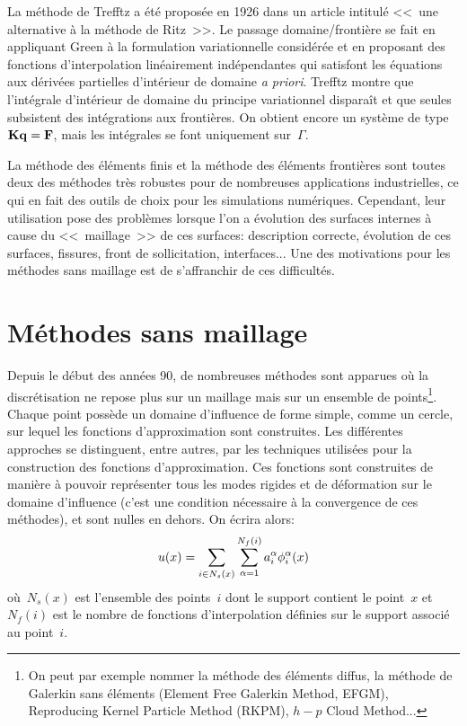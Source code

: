 \medskip
La méthode de Trefftz a été proposée en 1926 dans un article intitulé <<~une alternative à la méthode de Ritz~>>. Le passage domaine/frontière se fait en appliquant Green à la formulation variationnelle considérée et en proposant des fonctions d'interpolation linéairement indépendantes qui satisfont les équations aux dérivées partielles d'intérieur de domaine \emph{a priori}. Trefftz montre que l'intégrale d'intérieur de domaine du principe variationnel disparaît et que seules subsistent des intégrations aux frontières. 
On obtient encore un système de type~$\MM{K}\VV{q}=\VV{F}$, mais les intégrales se font uniquement
sur~$\Gamma$.

\medskip
La méthode des éléments finis et la méthode des éléments frontières sont toutes deux des méthodes très robustes pour de nombreuses applications industrielles, ce qui en fait des outils de choix pour les simulations numériques. Cependant, leur utilisation pose des problèmes lorsque l'on a évolution des surfaces internes à cause du <<~maillage~>> de ces surfaces: description correcte, évolution de ces surfaces, fissures, front de sollicitation, interfaces... Une des motivations pour les méthodes sans maillage est de s'affranchir de ces difficultés.



\medskip
\section{Méthodes sans maillage}\label{Sec-meshless}

Depuis le début des années 90, de nombreuses méthodes sont apparues où la discrétisation ne repose plus sur un maillage mais sur un ensemble de points\footnote{On peut par exemple nommer la méthode des éléments diffus, la méthode de Galerkin sans éléments (Element Free Galerkin Method, EFGM), Reproducing Kernel Particle Method (RKPM), $h-p$ Cloud Method...}. Chaque point possède un domaine d'influence de forme simple, comme un cercle, sur lequel les fonctions d'approximation sont construites. Les différentes approches se distinguent, entre autres, par les techniques utilisées pour la construction des fonctions d'approximation. Ces fonctions sont construites de manière à pouvoir représenter tous les modes rigides et de déformation sur le domaine d'influence (c'est une condition nécessaire à la convergence de ces méthodes), et sont nulles en dehors. On écrira alors:
\begin{equation}
u(x) = \displaystyle\sum_{i\in N_s(x)}\displaystyle\sum_{\alpha=1}^{N_f(i)} a_i^\alpha \phi_i^\alpha(x)
\end{equation}
où~$N_s(x)$ est l'ensemble des points~$i$ dont le support contient le point~$x$ et~$N_f (i)$ est le nombre de fonctions d'interpolation définies sur le support associé au point~$i$.

